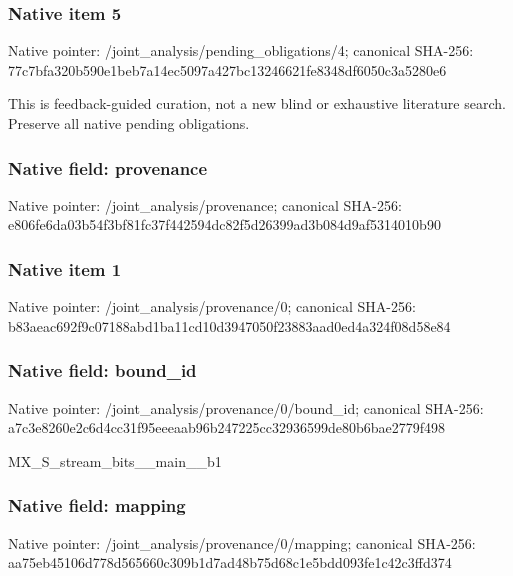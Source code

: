 \documentclass[10pt,a4paper]{article}
\begin{document}
\subsubsection{Native item 5}
Native pointer: /joint\_\allowbreak{}analysis/pending\_\allowbreak{}obligations/4; canonical SHA-256: 77c7bfa320b590e1beb7a14ec5097a427bc13246621fe8348df6050c3a5280e6

\begingroup\raggedright\sloppy This is feedback-guided curation,\allowbreak{} not a new blind or exhaustive literature search. Preserve all native pending obligations.\par\endgroup

\subsubsection{Native field: provenance}
Native pointer: /joint\_\allowbreak{}analysis/provenance; canonical SHA-256: e806fe6da03b54f3bf81fc37f442594dc82f5d26399ad3b084d9af5314010b90

\subsubsection{Native item 1}
Native pointer: /joint\_\allowbreak{}analysis/provenance/0; canonical SHA-256: b83aeac692f9c07188abd1ba11cd10d3947050f23883aad0ed4a324f08d58e84

\subsubsection{Native field: bound\_\allowbreak{}id}
Native pointer: /joint\_\allowbreak{}analysis/provenance/0/bound\_\allowbreak{}id; canonical SHA-256: a7c3e8260e2c6d4cc31f95eeeaab96b247225cc32936599de80b6bae2779f498

\begingroup\raggedright\sloppy MX\_\allowbreak{}S\_\allowbreak{}stream\_\allowbreak{}bits\_\allowbreak{}\_\allowbreak{}main\_\allowbreak{}\_\allowbreak{}b1\par\endgroup

\subsubsection{Native field: mapping}
Native pointer: /joint\_\allowbreak{}analysis/provenance/0/mapping; canonical SHA-256: aa75eb45106d778d565660c309b1d7ad48b75d68c1e5bdd093fe1c42c3ffd374
\end{document}
